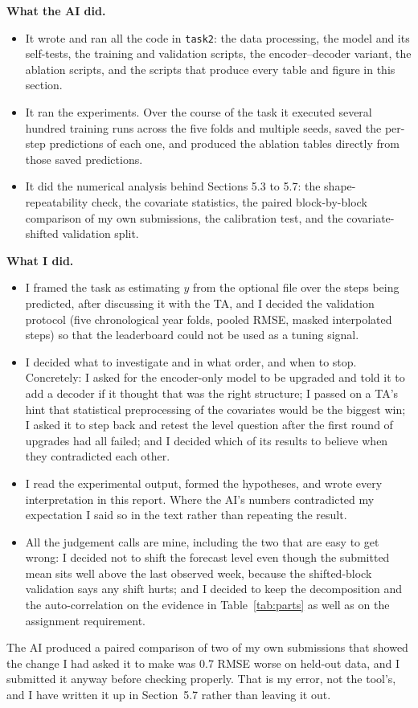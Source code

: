 \documentclass[11pt,letterpaper]{article}
\begin{document}
\textbf{What the AI did.}
\begin{itemize}
\item It wrote and ran all the code in \texttt{task2}: the data processing, the model and its self-tests, the training and validation scripts, the encoder--decoder variant, the ablation scripts, and the scripts that produce every table and figure in this section.
\item It ran the experiments. Over the course of the task it executed several hundred training runs across the five folds and multiple seeds, saved the per-step predictions of each one, and produced the ablation tables directly from those saved predictions.
\item It did the numerical analysis behind Sections 5.3 to 5.7: the shape-repeatability check, the covariate statistics, the paired block-by-block comparison of my own submissions, the calibration test, and the covariate-shifted validation split.
\end{itemize}

\textbf{What I did.}
\begin{itemize}
\item I framed the task as estimating $y$ from the optional file over the steps being predicted, after discussing it with the TA, and I decided the validation protocol (five chronological year folds, pooled RMSE, masked interpolated steps) so that the leaderboard could not be used as a tuning signal.
\item I decided what to investigate and in what order, and when to stop. Concretely: I asked for the encoder-only model to be upgraded and told it to add a decoder if it thought that was the right structure; I passed on a TA's hint that statistical preprocessing of the covariates would be the biggest win; I asked it to step back and retest the level question after the first round of upgrades had all failed; and I decided which of its results to believe when they contradicted each other.
\item I read the experimental output, formed the hypotheses, and wrote every interpretation in this report. Where the AI's numbers contradicted my expectation I said so in the text rather than repeating the result.
\item All the judgement calls are mine, including the two that are easy to get wrong: I decided {not} to shift the forecast level even though the submitted mean sits well above the last observed week, because the shifted-block validation says any shift hurts; and I decided to keep the decomposition and the auto-correlation on the evidence in Table~\ref{tab:parts} as well as on the assignment requirement.
\end{itemize}

The AI produced a paired comparison of two of my own submissions that showed the change I had asked it to make was 0.7 RMSE {worse} on held-out data, and I submitted it anyway before checking properly. That is my error, not the tool's, and I have written it up in Section~5.7 rather than leaving it out.
\end{document}
